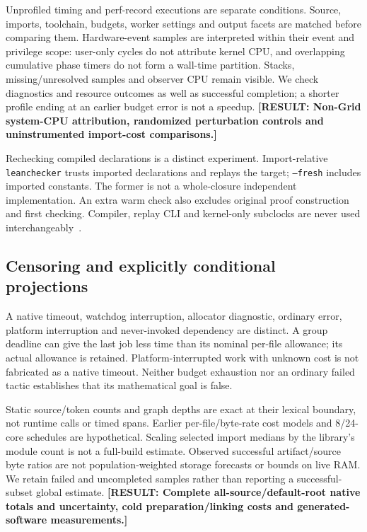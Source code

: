 \documentclass[10pt,twocolumn]{article}
\newcommand{\missing}[1]{\textbf{[RESULT: #1]}}
\begin{document}
Unprofiled timing and perf-record executions are separate conditions.
Source, imports, toolchain, budgets, worker settings and output facets are
matched before comparing them.
Hardware-event samples are interpreted within their event and privilege
scope: user-only cycles do not attribute kernel CPU, and overlapping
cumulative phase timers do not form a wall-time partition.
Stacks, missing/unresolved samples and observer CPU remain visible.
We check diagnostics and resource outcomes as well as successful completion;
a shorter profile ending at an earlier budget error is not a speedup.
\missing{Non-Grid system-CPU attribution, randomized perturbation
controls and uninstrumented import-cost comparisons.}

Rechecking compiled declarations is a distinct experiment.
Import-relative \texttt{leanchecker} trusts imported declarations and replays
the target; \texttt{--fresh} includes imported constants.
The former is not a whole-closure independent implementation.
An extra warm check also excludes original proof construction and first
checking. Compiler, replay CLI and kernel-only subclocks are never used
interchangeably~\cite{leanCheckerDocs,lean4lean2025}.

\subsection{Censoring and explicitly conditional projections}
A native timeout, watchdog interruption, allocator diagnostic, ordinary
error, platform interruption and never-invoked dependency are distinct.
A group deadline can give the last job less time than its nominal per-file
allowance; its actual allowance is retained.
Platform-interrupted work with unknown cost is not fabricated as a
native timeout. Neither budget exhaustion nor an ordinary failed tactic
establishes that its mathematical goal is false.

Static source/token counts and graph depths are exact at their lexical
boundary, not runtime calls or timed spans.
Earlier per-file/byte-rate cost models and 8/24-core schedules are
hypothetical. Scaling selected import medians by the library's module
count is not a full-build estimate.
Observed successful artifact/source byte ratios are not population-weighted
storage forecasts or bounds on live RAM.
We retain failed and uncompleted samples rather than reporting a
successful-subset global estimate.
\missing{Complete all-source/default-root native totals and uncertainty,
cold preparation/linking costs and generated-software measurements.}
\end{document}
